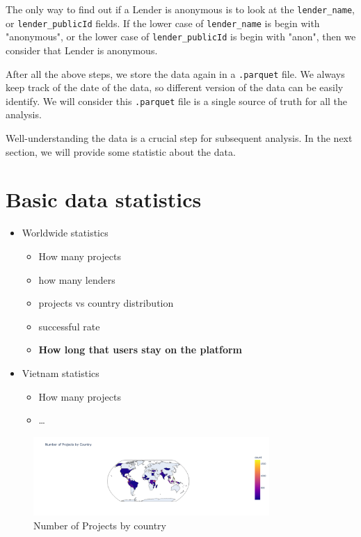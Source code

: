 The only way to find out if a Lender is anonymous is to look at the \lstinline|lender_name|,
or \lstinline|lender_publicId| fields.
If the lower case of \lstinline|lender_name| is begin with "anonymous",
or the lower case of \lstinline|lender_publicId| is begin with "anon",
then we consider that Lender is anonymous.


After all the above steps, we store the data again in a \lstinline|.parquet| file.
We always keep track of the date of the data, so different version of the data can be easily identify.
We will consider this \lstinline|.parquet| file is a single source of truth for all the analysis.

Well-understanding the data is a crucial step for subsequent analysis.
In the next section, we will provide some statistic about the data.

\section{Basic data statistics}

\begin{itemize}
	\item Worldwide statistics
	      \begin{itemize}
		      \item How many projects
		      \item how many lenders
		      \item projects vs country distribution
		      \item successful rate
		      \item \textbf{How long that users stay on the platform}
	      \end{itemize}
	\item Vietnam statistics
	      \begin{itemize}
		      \item How many projects
		      \item \dots
	      \end{itemize}
\end{itemize}


\begin{figure}[H]
	\centering
	\includegraphics[width=0.8\textwidth]{images/map-number-project-by-country.png}
	\caption{Number of Projects by country}
	\label{fig:map-number-project-by-country}
\end{figure}


